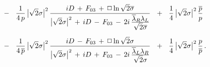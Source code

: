 \documentclass[epsfig,12pt]{article}
\newcommand{\ov}{\overline}
\begin{document}
\begin{align}
%
\notag
	&
		~~-~~  \frac{1}{4\, p}\, \big|\sqrt{2}\sigma\big|^2\,
			\frac{iD \,+\, F_{03} \,+\, \Box \ln \sqrt{2}\ov\sigma}
			{
				\big|\sqrt{2}\sigma\big|^2 \,+\, iD \,-\, F_{03} 
				\,-\, 2i\,\frac{\displaystyle \ov\lambda{}_R\lambda_L}{\displaystyle \sqrt{2}\ov\sigma}
			}
		~~+~~  \frac{1}{4}\, \big|\sqrt{2}\sigma\big|^2\, \frac{\ov p}{p}
	\\[2mm]
%
\notag
	&
		~~-~~  \frac{1}{4\, \ov p}\, \big|\sqrt{2}\sigma\big|^2\,
			\frac{iD \,-\, F_{03} \,+\, \Box \ln \sqrt{2}\sigma}
			{
				\big|\sqrt{2}\sigma\big|^2 \,+\, iD \,+\, F_{03} 
				\,-\, 2i\,\frac{\displaystyle \ov\lambda{}_L\lambda_R}{\displaystyle \sqrt{2}\sigma}
			}
		~~+~~  \frac{1}{4}\, \big|\sqrt{2}\sigma\big|^2\, \frac{p}{\ov p}
	\,.
\end{align}
\endgroup
\end{document}
